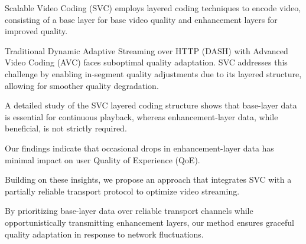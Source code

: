 Scalable Video Coding (SVC) employs layered coding techniques to encode video,
consisting of a base layer for base video quality and enhancement layers for
improved quality. 

Traditional Dynamic Adaptive Streaming over HTTP (DASH) with Advanced Video
Coding (AVC) faces suboptimal quality adaptation. SVC addresses this challenge
by enabling in-segment quality adjustments due to its layered structure,
allowing for smoother quality degradation.

A detailed study of the SVC layered coding structure shows that base-layer data
is essential for continuous playback, whereas enhancement-layer data, while
beneficial, is not strictly required. 

Our findings indicate that occasional drops in enhancement-layer data has
minimal impact on user Quality of Experience (QoE).

Building on these insights, we propose an approach that integrates SVC with a
partially reliable transport protocol to optimize video streaming. 

By prioritizing base-layer data over reliable transport channels while
opportunistically transmitting enhancement layers, our method ensures graceful
quality adaptation in response to network fluctuations.
